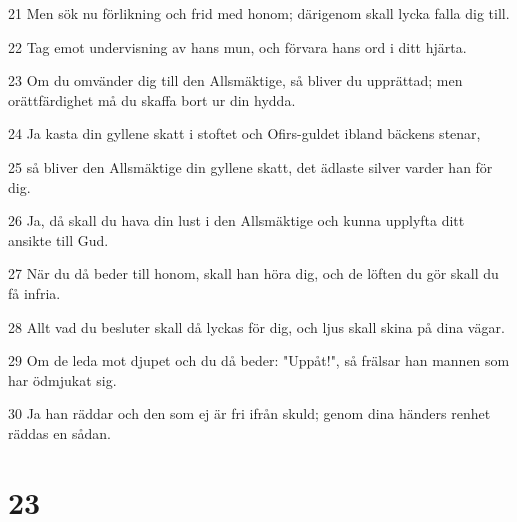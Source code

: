 \par 21 Men sök nu förlikning och frid med honom; därigenom skall lycka falla dig till.
\par 22 Tag emot undervisning av hans mun, och förvara hans ord i ditt hjärta.
\par 23 Om du omvänder dig till den Allsmäktige, så bliver du upprättad; men orättfärdighet må du skaffa bort ur din hydda.
\par 24 Ja kasta din gyllene skatt i stoftet och Ofirs-guldet ibland bäckens stenar,
\par 25 så bliver den Allsmäktige din gyllene skatt, det ädlaste silver varder han för dig.
\par 26 Ja, då skall du hava din lust i den Allsmäktige och kunna upplyfta ditt ansikte till Gud.
\par 27 När du då beder till honom, skall han höra dig, och de löften du gör skall du få infria.
\par 28 Allt vad du besluter skall då lyckas för dig, och ljus skall skina på dina vägar.
\par 29 Om de leda mot djupet och du då beder: "Uppåt!", så frälsar han mannen som har ödmjukat sig.
\par 30 Ja han räddar och den som ej är fri ifrån skuld; genom dina händers renhet räddas en sådan.

\chapter{23}

